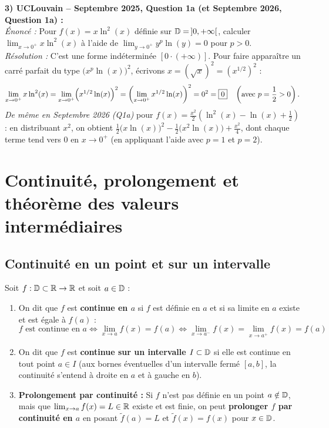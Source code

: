 \begin{exemple}
\medskip
\textbf{3) UCLouvain -- Septembre 2025, Question 1a (et Septembre 2026, Question 1a) :}\\
\emph{Énoncé :} Pour $f(x) = x\ln^2(x)$ définie sur $\mathbb{D} = \,]0, +\infty[$, calculer $\lim_{x \to 0^+} x\ln^2(x)$ à l'aide de $\lim_{y \to 0^+} y^p\ln(y) = 0$ pour $p > 0$.\\
\emph{Résolution :} C'est une forme indéterminée $[0 \cdot (+\infty)]$. Pour faire apparaître un carré parfait du type $\bigl(x^p\ln(x)\bigr)^2$, écrivons $x = (\sqrt{x})^2 = (x^{1/2})^2$ :
\[
    \lim_{x \to 0^+} x\ln^2(x) = \lim_{x \to 0^+} \Bigl(x^{1/2}\ln(x)\Bigr)^2 = \left(\lim_{x \to 0^+} x^{1/2}\ln(x)\right)^2 = 0^2 = \boxed{0} \quad \left(\text{avec } p = \frac{1}{2} > 0\right).
\]
\emph{De même en Septembre 2026 (Q1a)} pour $f(x) = \frac{x^2}{2}\left(\ln^2(x) - \ln(x) + \frac{1}{2}\right)$ : en distribuant $x^2$, on obtient $\frac{1}{2}\bigl(x\ln(x)\bigr)^2 - \frac{1}{2}\bigl(x^2\ln(x)\bigr) + \frac{x^2}{4}$, dont chaque terme tend vers $0$ en $x \to 0^+$ (en appliquant l'aide avec $p=1$ et $p=2$).
\end{exemple}

\section{Continuité, prolongement et théorème des valeurs intermédiaires}

\subsection{Continuité en un point et sur un intervalle}

\begin{definition}
Soit $f : \mathbb{D} \subset \mathbb{R} \to \mathbb{R}$ et soit $a \in \mathbb{D}$ :
\begin{enumerate}
    \item On dit que $f$ est \textbf{continue en $a$} si $f$ est définie en $a$ et si sa limite en $a$ existe et est égale à $f(a)$ :
    \[
        \boxed{f \text{ est continue en } a \iff \lim_{x \to a} f(x) = f(a) \iff \lim_{x \to a^-} f(x) = \lim_{x \to a^+} f(x) = f(a)}.
    \]
    \item On dit que $f$ est \textbf{continue sur un intervalle $I \subset \mathbb{D}$} si elle est continue en tout point $a \in I$ (aux bornes éventuelles d'un intervalle fermé $[a, b]$, la continuité s'entend à droite en $a$ et à gauche en $b$).
    \item \textbf{Prolongement par continuité :} Si $f$ n'est pas définie en un point $a \notin \mathbb{D}$, mais que $\lim_{x \to a} f(x) = L \in \mathbb{R}$ existe et est finie, on peut \textbf{prolonger $f$ par continuité en $a$} en posant $\tilde{f}(a) = L$ et $\tilde{f}(x) = f(x)$ pour $x \in \mathbb{D}$.
\end{enumerate}
\end{definition}

